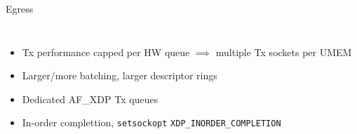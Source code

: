 \documentclass[aspectratio=169]{beamer}
\begin{document}
  \begin{frame}{Egress}
  \begin{columns}[T,onlytextwidth]
    \begin{itemize}
    \item Tx performance capped per HW queue $\implies$ multiple Tx
      sockets per UMEM
    \item Larger/more batching, larger descriptor rings
    \item Dedicated AF\_XDP Tx queues
    \item In-order complettion, {\tt setsockopt} {\tt XDP\_INORDER\_COMPLETION}
    \end{itemize}
    \centering{}
    \end{columns}
  \end{frame}
\end{document}
